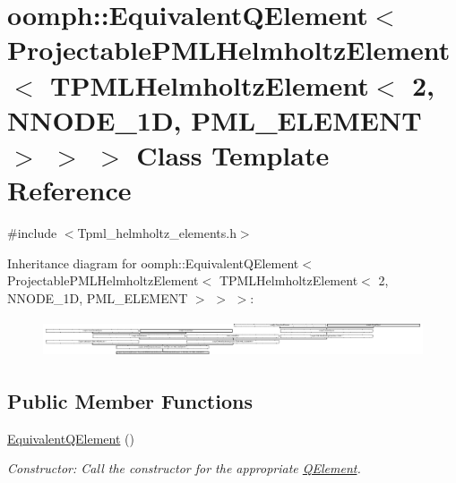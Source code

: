 \hypertarget{classoomph_1_1EquivalentQElement_3_01ProjectablePMLHelmholtzElement_3_01TPMLHelmholtzElement_3_0495133458c30170646ec413b7351c35f}{}\section{oomph\+:\+:Equivalent\+Q\+Element$<$ Projectable\+P\+M\+L\+Helmholtz\+Element$<$ T\+P\+M\+L\+Helmholtz\+Element$<$ 2, N\+N\+O\+D\+E\+\_\+1D, P\+M\+L\+\_\+\+E\+L\+E\+M\+E\+NT $>$ $>$ $>$ Class Template Reference}
\label{classoomph_1_1EquivalentQElement_3_01ProjectablePMLHelmholtzElement_3_01TPMLHelmholtzElement_3_0495133458c30170646ec413b7351c35f}


{\ttfamily \#include $<$Tpml\+\_\+helmholtz\+\_\+elements.\+h$>$}

Inheritance diagram for oomph\+:\+:Equivalent\+Q\+Element$<$ Projectable\+P\+M\+L\+Helmholtz\+Element$<$ T\+P\+M\+L\+Helmholtz\+Element$<$ 2, N\+N\+O\+D\+E\+\_\+1D, P\+M\+L\+\_\+\+E\+L\+E\+M\+E\+NT $>$ $>$ $>$\+:\begin{figure}[H]
\begin{center}
\leavevmode
\includegraphics[height=1.120000cm]{classoomph_1_1EquivalentQElement_3_01ProjectablePMLHelmholtzElement_3_01TPMLHelmholtzElement_3_0495133458c30170646ec413b7351c35f}
\end{center}
\end{figure}
\subsection*{Public Member Functions}
\begin{DoxyCompactItemize}
\item 
\hyperlink{classoomph_1_1EquivalentQElement_3_01ProjectablePMLHelmholtzElement_3_01TPMLHelmholtzElement_3_0495133458c30170646ec413b7351c35f_afa49d09de80f68d143399781ad1de263}{Equivalent\+Q\+Element} ()
\begin{DoxyCompactList}\small\item\em Constructor\+: Call the constructor for the appropriate \hyperlink{classoomph_1_1QElement}{Q\+Element}. \end{DoxyCompactList}\end{DoxyCompactItemize}
